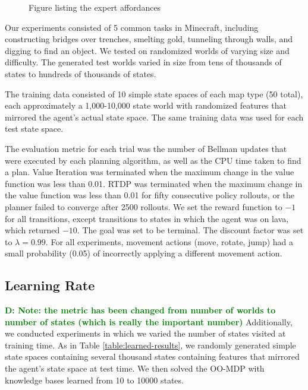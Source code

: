 \documentclass[conference]{IEEEtran}
\newcommand{\dnote}[1]{\textcolor{Green}{\textbf{D: #1}}}
\begin{document}
\begin{figure}
Figure listing the expert affordances
\label{fig:afford_kb_exp}
\end{figure}

Our experiments consisted of 5 common tasks in Minecraft, including
constructing bridges over trenches, smelting gold, tunneling
through walls, and digging to find an object.  We tested on 
randomized worlds of varying size and difficulty. The generated test
worlds varied in size from tens of thousands of states to hundreds of thousands of states.

The training data consisted of 10 simple state spaces of each map type
(50 total), each approximately a 1,000-10,000 state world with randomized
features that mirrored the agent's actual state space. The same training data
was used for each test state space.

The evaluation metric for each trial was the
number of Bellman updates that were executed by each planning
algorithm, as well as the CPU time taken to find a plan. Value Iteration was terminated when the maximum change in
the value function was less than 0.01. RTDP was terminated when the
maximum change in the value function was less than 0.01 for fifty
consecutive policy rollouts, or the planner failed to converge after 2500 rollouts.
We set the reward function to $-1$ for all transitions, except
transitions to states in which the agent was on lava, which returned 
$-10$. The goal was set to be terminal. The discount
factor was set to $\lambda = 0.99$. For all experiments, movement actions
(move, rotate, jump) had a small probability (0.05) of incorrectly applying a different movement action.

\subsection{Learning Rate}
\dnote{Note: the metric has been changed from number of worlds to number of states (which is really the important number)}
Additionally, we conducted experiments in which we varied the number of states visited at training time.
As in Table \ref{table:learned-results}, we randomly generated simple state
spaces containing several thousand states containing features that mirrored the agent's state space at test time. We then solved
the OO-MDP with knowledge bases learned from 10 to 10000 states.

\end{document}
